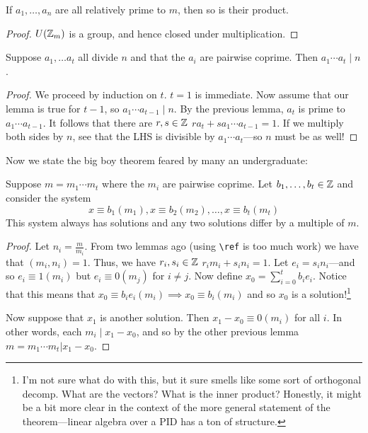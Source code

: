 \begin{lemma}
If \(a_1, \dots , a_n\) are all relatively prime to \(m\), then so is their product.
\end{lemma}

\begin{proof}
  \(U(\mathbb{Z}_m)\) is a group, and hence closed under multiplication.
\end{proof}

\begin{lemma}
Suppose \(a_1, \dots a_t\) all divide \(n\) and that the \(a_i\) are pairwise
coprime. Then \(a_1\cdots a_t\mid n\).
\end{lemma}
\begin{proof}
  We proceed by induction on \(t\). \(t=1\) is immediate. Now assume that our
  lemma is true for \(t-1\), so \(a_1\cdots a_{t-1} \mid n\). By the previous
  lemma, \(a_t\) is prime to \(a_1\cdots a_{t-1}\). It follows that there are
  \(r,s \in \mathbb{Z} \) \st \(ra_t + sa_1\cdots a_{t-1} =1\). If we multiply both
  sides by \(n\), see that the LHS is divisible by \(a_1\cdots a_t\)---so \(n\)
  must be as well!
\end{proof}

Now we state the big boy theorem feared by many an undergraduate:

\begin{theorem} 
Suppose \(m=m_1\cdots m_t\) where the \(m_i\) are pairwise coprime. Let
\(b_1, \dots , b_t \in \mathbb{Z} \) and consider the system
\[
  x \equiv b_1(m_1), x \equiv b_2 (m_2), \dots ,x \equiv b_t (m_t)
\]
This system always has solutions and any two solutions differ by a multiple of \(m\).
\end{theorem}

\begin{proof}
  Let \(n_i= \frac{m}{m_i}\). From two lemmas ago (using \verb|\ref| is too much
  work) we have that \((m_i,n_i)=1\). Thus, we have \(r_i,s_i \in \mathbb{Z} \) \st
  \(r_i m_i+s_i n_i=1\). Let \(e_i=s_i n_i\)---and so \(e_i\equiv 1 (m_i)\) but
  \(e_i \equiv 0 (m_j)\) for \(i\neq j\). Now define \(x_0= \sum_{i=0}^t b_i e_i\). Notice that this means that
  \(x_0 \equiv b_i e_i (m_i)\implies x_0\equiv b_i(m_i)\) and so \(x_0\) is a
  solution!\footnote{I'm not sure what do with this, but it sure smells like
    some sort of orthogonal decomp. What are the vectors? What is the inner
    product? Honestly, it might be a bit more clear in the context of the more
    general statement of the theorem---linear algebra over a PID has a ton of structure.}

  Now suppose that \(x_1\) is another solution. Then \(x_1-x_0\equiv 0 (m_i)\)
  for all \(i\). In other words, each \(m_i\mid x_1-x_0\), and so by the other
  previous lemma \(m = m_1\cdots m_t | x_1-x_0\).
\end{proof}

